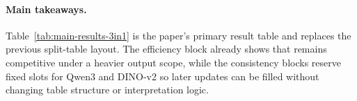 \paragraph{Main takeaways.}
Table~\ref{tab:main-results-3in1} is the paper's primary result table and replaces the previous split-table layout. The efficiency block already shows that \dn remains competitive under a heavier output scope, while the consistency blocks reserve fixed slots for Qwen3 and DINO-v2 so later updates can be filled without changing table structure or interpretation logic.
